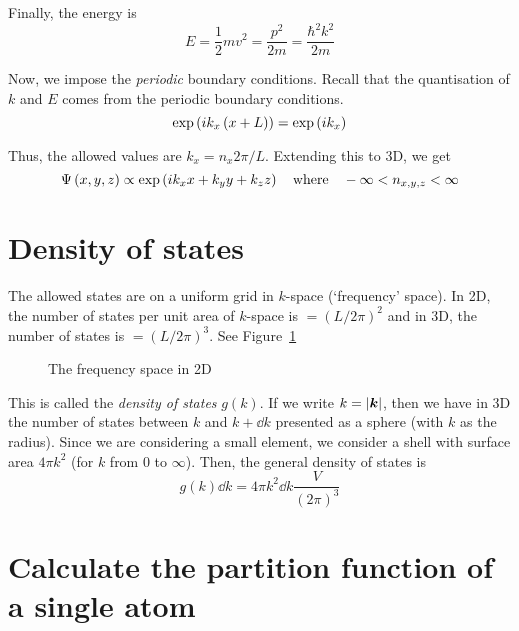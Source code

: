 \documentclass[12pt,chapterprefix=false,dvipsnames]{scrbook}
\theoremstyle{dotless}
\theoremstyle{definition}
\def\vec#1{{\ensuremath{\bm{{#1}}}}}
\begin{document}
Finally, the energy is
\begin{equation}
	E = \frac{1}{2}mv^2 = \frac{p^2}{2m} =
	\frac{\hbar^2 k^2}{2m}
\end{equation}

Now, we impose the \textit{periodic} boundary conditions.
Recall that the quantisation of $k$ and
$E$ comes from the periodic boundary
conditions.
\begin{equation}
	\exponential\left(i k_x \left(x+L\right)\right) =
	\exponential\left(ik_x\right)
\end{equation}

Thus, the allowed values are $k_x = n_x 2\pi / L$. Extending
this to 3D, we get
\begin{equation}
	\Psi\left(x,y,z\right)
	\propto
	\exponential\left(i k_x x + k_y y + k_z z\right)
	\hspace{1em}
	\mathrm{where}
	\hspace{1em}
	-\infty < n_{x,y,z} < \infty
\end{equation}

\section{Density of states}%
\label{sec:density_of_states}

The allowed states are on a uniform grid in
$k$-space (`frequency' space). In 2D, the
number of states per unit area of $k$-space
is $ = {\left( L/2\pi\right) }^2 $ and in 3D, the number of states is
$ = { \left( L/2\pi\right) }^3$. See Figure~\ref{fig:frequency_space}

\begin{figure}[htpb]
	\centering
	
	\caption{The frequency space in 2D}%
	\label{fig:frequency_space}
\end{figure}

This is called the \textit{density of states}
$g\left(k\right)$. If we write $k = \abs{ \vec{k}}$,
then we have in 3D the number of states between
$k$ and $k + \dd{k}$ presented as
a sphere (with $k$ as the radius). Since we
are considering a small element, we consider a shell with
surface area $4\pi k^2$ (for
$k$ from 0 to $\infty$).
Then, the general density of states is
\begin{equation}
	g\left(k\right)\dd{k} = 4\pi k^2
	\dd{k} \frac{V}{{\left(2\pi\right)}^3}
\end{equation}

\section{Calculate the partition function of a single atom}%
\label{sec:calculate_the_partition_function_of_a_single_atom}
\end{document}
